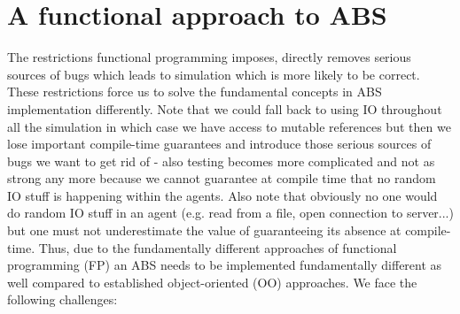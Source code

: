 \section{A functional approach to ABS}
The restrictions functional programming imposes, directly removes serious sources of bugs which leads to simulation which is more likely to be correct. These restrictions force us to solve the fundamental concepts in ABS implementation differently. Note that we could fall back to using IO throughout all the simulation in which case we have access to mutable references but then we lose important compile-time guarantees and introduce those serious sources of bugs we want to get rid of - also testing becomes more complicated and not as strong any more because we cannot guarantee at compile time that no random IO stuff is happening within the agents. Also note that obviously no one would do random IO stuff in an agent (e.g. read from a file, open connection to server...) but one must not underestimate the value of guaranteeing its absence at compile-time. Thus, due to the fundamentally different approaches of functional programming (FP) an ABS needs to be implemented fundamentally different as well compared to established object-oriented (OO) approaches. We face the following challenges:

